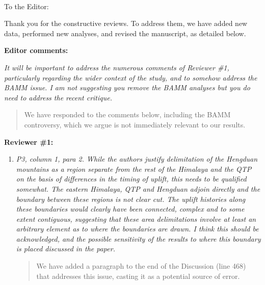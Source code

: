 \documentclass[11pt]{letter}
\begin{document}
\raggedright{}


\begin{letter}{ \\

}
\address{Integrative Research Center\\
  The Field Museum\\
  1400 South Lake Shore Drive\\
  Chicago, IL  60605-2496\\
  USA}

\opening{To the Editor:}

Thank you for the constructive reviews. To address them, we have added
new data, performed new analyses, and revised the manuscript, as
detailed below.

\textbf{Editor comments:}

\textit{It will be important to address the numerous comments of
  Reviewer \#1, particularly regarding the wider context of the study,
  and to somehow address the BAMM issue. I am not suggesting you
  remove the BAMM analyses but you do need to address the recent
  critique.}

\begin{quote}
  We have responded to the comments below, including the BAMM
  controversy, which we argue is not immediately relevant to our
  results.
\end{quote}

\textbf{Reviewer \#1:}

\begin{enumerate}
\item \textit{P3, column 1, para 2. While the authors justify
    delimitation of the Hengduan mountains as a region separate from
    the rest of the Himalaya and the QTP on the basis of differences
    in the timing of uplift, this needs to be qualified somewhat. The
    eastern Himalaya, QTP and Hengduan adjoin directly and the
    boundary between these regions is not clear cut. The uplift
    histories along these boundaries would clearly have been
    connected, complex and to some extent contiguous, suggesting that
    these area delimitations involve at least an arbitrary element as
    to where the boundaries are drawn. I think this should be
    acknowledged, and the possible sensitivity of the results to where
    this boundary is placed discussed in the paper.}

\begin{quote}
  We have added a paragraph to the end of the Discussion (line 468)
  that addresses this issue, casting it as a potential source of
  error.
\end{quote}


\end{enumerate}
\end{letter}
\end{document}
